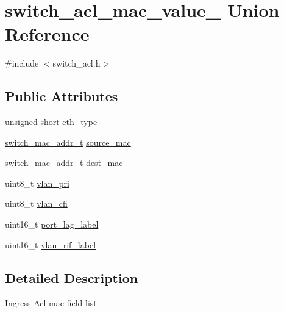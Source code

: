 \hypertarget{unionswitch__acl__mac__value__}{\section{switch\+\_\+acl\+\_\+mac\+\_\+value\+\_\+ Union Reference}
\label{unionswitch__acl__mac__value__}
}


{\ttfamily \#include $<$switch\+\_\+acl.\+h$>$}

\subsection*{Public Attributes}
\begin{DoxyCompactItemize}
\item 
unsigned short \hyperlink{unionswitch__acl__mac__value___abcb655666230c1fd1b473a4994e63dd7}{eth\+\_\+type}
\item 
\hyperlink{structswitch__mac__addr__s}{switch\+\_\+mac\+\_\+addr\+\_\+t} \hyperlink{unionswitch__acl__mac__value___ae8d3954ec38a08c331fde2a7e652c320}{source\+\_\+mac}
\item 
\hyperlink{structswitch__mac__addr__s}{switch\+\_\+mac\+\_\+addr\+\_\+t} \hyperlink{unionswitch__acl__mac__value___a720f45c898590d8d67251a2e7277cd4c}{dest\+\_\+mac}
\item 
uint8\+\_\+t \hyperlink{unionswitch__acl__mac__value___a349ea85127b615ea30a93dbce4645636}{vlan\+\_\+pri}
\item 
uint8\+\_\+t \hyperlink{unionswitch__acl__mac__value___a6c38bed7dd33935228f75926adb49c97}{vlan\+\_\+cfi}
\item 
uint16\+\_\+t \hyperlink{unionswitch__acl__mac__value___a8921a492a7a87d433728d40bdd85fb76}{port\+\_\+lag\+\_\+label}
\item 
uint16\+\_\+t \hyperlink{unionswitch__acl__mac__value___ad27333d3735b51614c871e4947ab7abc}{vlan\+\_\+rif\+\_\+label}
\end{DoxyCompactItemize}


\subsection{Detailed Description}
Ingress Acl mac field list 

